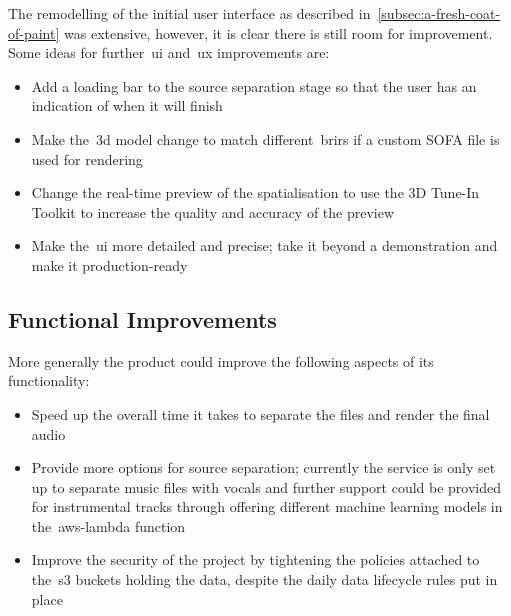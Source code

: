 The remodelling of the initial user interface as described in~\ref{subsec:a-fresh-coat-of-paint} was extensive,
however, it is clear there is still room for improvement.
Some ideas for further~\gls{ui} and~\gls{ux} improvements are:
\begin{itemize}
    \item Add a loading bar to the source separation stage so that the user has an indication of when it will finish
    \item Make the~\gls{3d} model change to match different~\glspl{brir} if a custom SOFA file is used for rendering
    \item Change the real-time preview of the spatialisation to use the 3D Tune-In Toolkit to increase the quality and accuracy of the preview
    \item Make the~\gls{ui} more detailed and precise; take it beyond a demonstration and make it production-ready
\end{itemize}

\subsection{Functional Improvements}\label{subsec:functional-improvements}

More generally the product could improve the following aspects of its functionality:

\begin{itemize}
    \item Speed up the overall time it takes to separate the files and render the final audio
    \item Provide more options for source separation; currently the service is only set up to separate music files with vocals and further support could be provided for instrumental tracks through offering different machine learning models in the~\gls{aws-lambda} function
    \item Improve the security of the project by tightening the policies attached to the~\gls{s3} buckets holding the data, despite the daily data lifecycle rules put in place
\end{itemize}